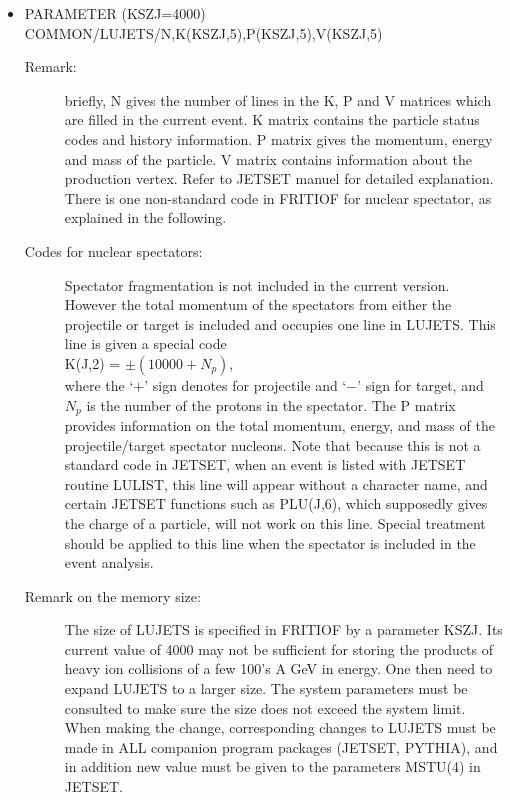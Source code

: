 \begin{itemize}
\item{PARAMETER (KSZJ=4000) \\
      COMMON/LUJETS/N,K(KSZJ,5),P(KSZJ,5),V(KSZJ,5)}

\begin{description}
\item[Remark: ] briefly, N gives the number of lines in the K, P and V matrices
            which are filled in the current event.  K matrix contains the
            particle status codes and history information.  P matrix gives
            the momentum, energy and mass of the particle.  V matrix contains
            information about the production vertex.  Refer to 
            JETSET manuel \cite{j73} for detailed explanation. 
            There is one non-standard code in FRITIOF for nuclear spectator, 
            as explained in the following.  
 
\item[Codes for nuclear spectators: ]  Spectator fragmentation is not included
            in the current version.  However the total momentum of the 
            spectators from either the projectile or target is included and
            occupies one line in LUJETS.  This line is given a special code\\
            K(J,2) = $\pm (10000+N_p)$, \\
            where the `$+$' sign denotes for projectile 
            and `$-$' sign for target,
            and $N_p$ is the number of the protons in the spectator.
            The P matrix provides information on the total momentum,
            energy, and mass of the projectile/target spectator nucleons.
            Note that because this is not a standard code in JETSET, when
            an event is listed with JETSET routine LULIST, this line will
            appear without a character name, and certain JETSET functions
            such as PLU(J,6), which supposedly gives the charge of a particle,
            will not work on this line.  Special treatment should be
            applied to this line when the spectator is included in the
            event analysis.   

\item[Remark on the memory size: ] The size of LUJETS is specified in
            FRITIOF by a parameter KSZJ.  Its current value of 4000 may not
            be sufficient for storing the products of heavy ion collisions of
            a few 100's A GeV in energy.  
            One then need to expand LUJETS to a larger size.  The system
            parameters must be consulted to make sure the size does not
            exceed the system limit.  
            When making the change,
            corresponding changes to LUJETS must be made in ALL companion
            program packages (JETSET, PYTHIA), 
            and in addition new value must be given to the
            parameters MSTU(4) in JETSET.  

\end{description}
\end{itemize} 

